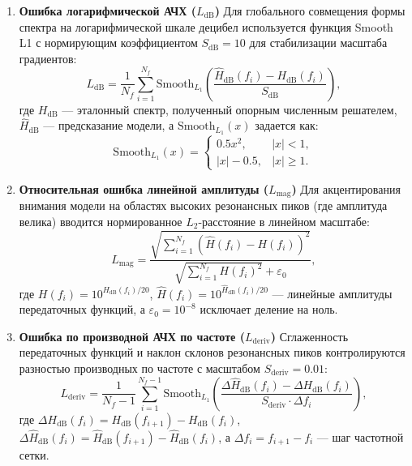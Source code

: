 \begin{enumerate}
    \item \textbf{Ошибка логарифмической АЧХ ($L_{\text{dB}}$)}
    Для глобального совмещения формы спектра на логарифмической шкале децибел используется функция Smooth L1 с нормирующим коэффициентом $S_{\text{dB}} = 10$ для стабилизации масштаба градиентов:
    \begin{equation}
        L_{\text{dB}} = \frac{1}{N_f} \sum_{i=1}^{N_f} \text{Smooth}_{L_1} \left( \frac{\widehat{H}_{\text{dB}}(f_i) - H_{\text{dB}}(f_i)}{S_{\text{dB}}} \right),
    \end{equation}
    где $H_{\text{dB}}$ — эталонный спектр, полученный опорным численным решателем, $\widehat{H}_{\text{dB}}$ — предсказание модели, а $\text{Smooth}_{L_1}(x)$ задается как:
    \begin{equation}
        \text{Smooth}_{L_1}(x) = \begin{cases} 
            0.5 x^2, & |x| < 1, \\
            |x| - 0.5, & |x| \ge 1.
        \end{cases}
    \end{equation}

    \item \textbf{Относительная ошибка линейной амплитуды ($L_{\text{mag}}$)}
    Для акцентирования внимания модели на областях высоких резонансных пиков (где амплитуда велика) вводится нормированное $L_2$-расстояние в линейном масштабе:
    \begin{equation}
        L_{\text{mag}} = \frac{\sqrt{\sum_{i=1}^{N_f} \left(\widehat{H}(f_i) - H(f_i)\right)^2}}{\sqrt{\sum_{i=1}^{N_f} H(f_i)^2} + \varepsilon_0},
    \end{equation}
    где $H(f_i) = 10^{H_{\text{dB}}(f_i)/20}$, $\widehat{H}(f_i) = 10^{\widehat{H}_{\text{dB}}(f_i)/20}$ — линейные амплитуды передаточных функций, а $\varepsilon_0 = 10^{-8}$ исключает деление на ноль.

    \item \textbf{Ошибка по производной АЧХ по частоте ($L_{\text{deriv}}$)}
    Сглаженность передаточных функций и наклон склонов резонансных пиков контролируются разностью производных по частоте с масштабом $S_{\text{deriv}} = 0.01$:
    \begin{equation}
        L_{\text{deriv}} = \frac{1}{N_f - 1} \sum_{i=1}^{N_f - 1} \text{Smooth}_{L_1} \left( \frac{\Delta \widehat{H}_{\text{dB}}(f_i) - \Delta H_{\text{dB}}(f_i)}{S_{\text{deriv}} \cdot \Delta f_i} \right),
    \end{equation}
    где $\Delta H_{\text{dB}}(f_i) = H_{\text{dB}}(f_{i+1}) - H_{\text{dB}}(f_i)$, $\Delta \widehat{H}_{\text{dB}}(f_i) = \widehat{H}_{\text{dB}}(f_{i+1}) - \widehat{H}_{\text{dB}}(f_i)$, а $\Delta f_i = f_{i+1} - f_i$ — шаг частотной сетки.


\end{enumerate}
